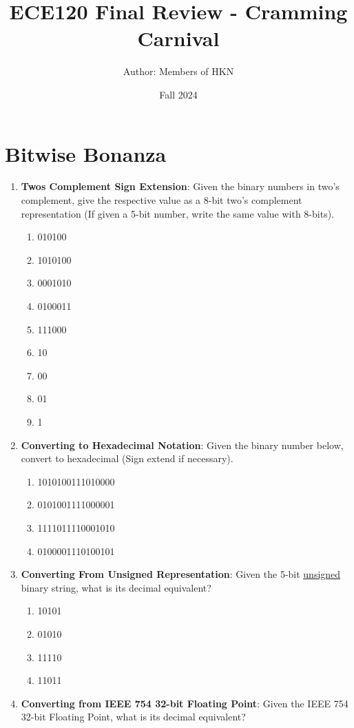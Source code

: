 \documentclass{article}
\title{ECE120 Final Review - Cramming Carnival}
\author{Author: Members of HKN}
\date{Fall 2024}
\begin{document}
\maketitle

\section{Bitwise Bonanza}
\begin{enumerate}[label=(\alph*)]
    \item \textbf{Twos Complement Sign Extension}: Given the binary numbers in two’s complement, give the respective value as a 8-bit two’s complement representation (If given a 5-bit number, write the same value with 8-bits).
    \begin{enumerate}[label=(\roman*)]
        \item 010100
        \item 1010100
        \item 0001010
        \item 0100011
        \item 111000
        \item 10
        \item 00
        \item 01
        \item 1
    \end{enumerate}
    \item \textbf{Converting to Hexadecimal Notation}: Given the binary number below, convert to hexadecimal (Sign extend if necessary).
    \begin{enumerate}[label=(\roman*)]
        \item 1010100111010000
        \item 0101001111000001
        \item 1111011110001010
        \item 0100001110100101
    \end{enumerate}
    \item \textbf{Converting From Unsigned Representation}: Given the 5-bit \underline{unsigned} binary string, what is its decimal equivalent?
    \begin{enumerate}[label=(\roman*)]
        \item 10101
        \item 01010
        \item 11110
        \item 11011
    \end{enumerate}
    \item \textbf{Converting from IEEE 754 32-bit Floating Point}: Given the IEEE 754 32-bit Floating Point, what is its decimal equivalent?

\end{enumerate}
\end{document}
